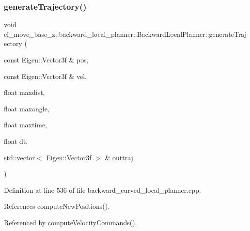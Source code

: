 \subsubsection{\texorpdfstring{generate\+Trajectory()}{generateTrajectory()}}
{\footnotesize\ttfamily void cl\+\_\+move\+\_\+base\+\_\+z\+::backward\+\_\+local\+\_\+planner\+::\+Backward\+Local\+Planner\+::generate\+Trajectory (\begin{DoxyParamCaption}\item[{const Eigen\+::\+Vector3f \&}]{pos,  }\item[{const Eigen\+::\+Vector3f \&}]{vel,  }\item[{float}]{maxdist,  }\item[{float}]{maxangle,  }\item[{float}]{maxtime,  }\item[{float}]{dt,  }\item[{std\+::vector$<$ Eigen\+::\+Vector3f $>$ \&}]{outtraj }\end{DoxyParamCaption})\hspace{0.3cm}{\ttfamily [private]}}



Definition at line 536 of file backward\+\_\+curved\+\_\+local\+\_\+planner.\+cpp.



References compute\+New\+Positions().



Referenced by compute\+Velocity\+Commands().



